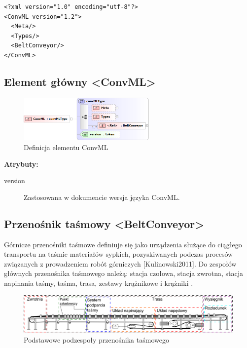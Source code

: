 \documentclass[12pt,a4paper]{article}
\begin{document}
\begin{verbatim}
<?xml version="1.0" encoding="utf-8"?>
<ConvML version="1.2">
  <Meta/>
  <Types/>
  <BeltConveyor/>
</ConvML>
\end{verbatim}  


\subsection{Element główny <ConvML>}

\begin{figure}[H]
  \centering
  \includegraphics[width=0.6\textwidth]{png/convml_xsd2}
  \caption{Definicja elementu ConvML}
  \label{fig:convml-xsd}
\end{figure}

\noindent\textbf{Atrybuty:}
\begin{description}
\item[version] Zastosowana w dokumencie wersja języka ConvML.
\end{description}


\subsection{Przenośnik taśmowy <BeltConveyor>}\label{sec:BeltConveyor}
Górnicze przenośniki taśmowe definiuje się jako urządzenia służące do ciągłego
transportu na taśmie materiałów sypkich, pozyskiwanych podczas procesów
związanych z prowadzeniem robót górniczych [Kulinowski2011].  Do zespołów
głównych przenośnika taśmowego należą: stacja czołowa, stacja zwrotna, stacja
napinania taśmy, taśma, trasa, zestawy krążnikowe i krążniki
\cite{Antoniak2005}.

\begin{figure}
  \centering
  \includegraphics[width=\textwidth]{png/belt_conveyor_drw}
  \caption{Podstawowe podzespoły przenośnika taśmowego}
  \label{fig:beltConveyor-drw}
\end{figure}
\end{document}
